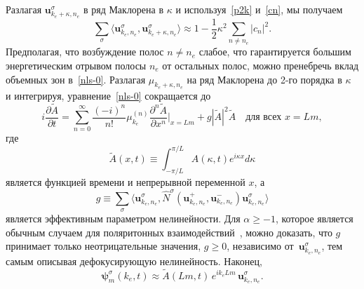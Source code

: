 \documentclass[
aps,
prl,
groupedaddress,
superscriptaddress,
floatfix,
notitlepage
]{revtex4-1}
\newcommand{\p}{\partial}
\begin{document}
Разлагая $\pmb{u}^{\sigma}_{k_e+\kappa,n_e}$ в ряд Маклорена в $\kappa$
и используя~\eqref{p2k} и~\eqref{cn}, мы получаем
\begin{equation}
\sum_{\sigma}\langle\pmb{u}^{\sigma}_{k_e,n_e},\pmb{u}^{\sigma}_{k_e+\kappa,n_e}\rangle\approx 1-\frac12 \kappa^2\sum_{n\neq n_e}|c_n|^2.
\label{cond}
\end{equation}
Предполагая, что возбуждение полос $n\neq n_e$ слабое, что гарантируется большим энергетическим отрывом полосы $n_e$ от остальных полос, можно пренебречь
вклад объемных зон в~\eqref{nls-0}.
Разлагая $\mu_{k_e+\kappa,n_e}$ на ряд Маклорена до 2-го порядка в $\kappa$ и интегрируя, уравнение~\eqref{nls-0} сокращается до
\begin{equation}
i\frac{\p \tilde{A}}{\p t} =
\sum_{n=0}^{\infty} \frac{(-i)^n}{n!} \mu_{k_e}^{(n)}\frac{\partial^n \tilde{A}}{\partial x^n}\Big|_{x=Lm}
+ g |\tilde{A}|^2 \tilde{A}\quad\text{для всех $x=Lm$},
\label{nls-2}
\end{equation}
где 
$$
\tilde{A}(x,t)\equiv \int_{-\pi/L}^{\pi/L} A(\kappa,t) e^{i\kappa x}  d\kappa
$$
является функцией времени и непрерывной переменной $x$, а 
$$
g\equiv \sum_\sigma\langle\pmb{u}^{\sigma}_{k_e,n_e},\hat{N}^{\sigma}(\pmb{u}_{k_e,n_e}^+,\pmb{u}_{k_e,n_e}^{-})\pmb{u}^{\sigma}_{k_e,n_e}\rangle
$$
является эффективным параметром нелинейности. Для $\alpha \ge -1$, которое является обычным случаем для поляритонных взаимодействий~\cite{Vladimirova}, можно доказать, что $g$ принимает только неотрицательные значения, $g\ge 0$, независимо от~$\pmb{u}_{k_e,n_e}^\sigma$, тем самым описывая дефокусирующую нелинейность.
Наконец, 
\begin{equation}
\pmb{\psi}^{\sigma}_m(k_e,t) \approx  \tilde{A}(Lm,t)\, e^{i k_e Lm}\, \pmb{u}^{\sigma}_{k_e,n_e}.
\label{psi-final}
\end{equation}
\end{document}
